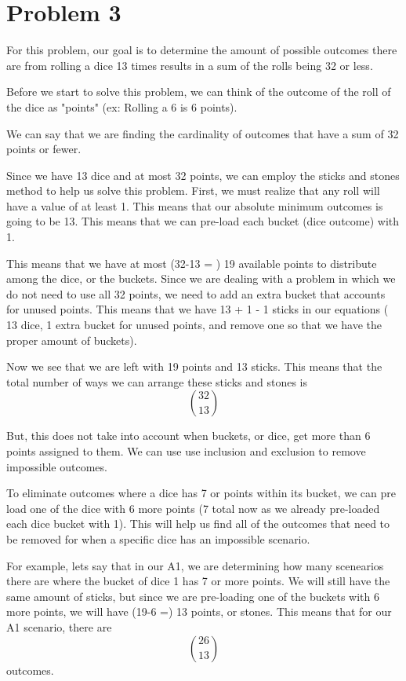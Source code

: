 \documentclass[11pt]{article}
\begin{document}
\section*{Problem 3}

For this problem, our goal is to determine the amount of possible outcomes there are from rolling a dice 13 times results in a sum of the rolls being 32 or less. 

Before we start to solve this problem, we can think of the outcome of the roll of the dice as "points" (ex: Rolling a 6 is 6 points).

We can say that we are finding the cardinality of outcomes that have a sum of 32 points or fewer.

Since we have 13 dice and at most 32 points, we can employ the sticks and stones method to help us solve this problem. First, we must realize that any roll will have a value of at least 1. This means that our absolute minimum outcomes is going to be 13. This means that we can pre-load each bucket (dice outcome) with 1. 

This means that we have at most (32-13 = ) 19 available points to distribute among the dice, or the buckets. Since we are dealing with a problem in which we do not need to use all 32 points, we need to add an extra bucket that accounts for unused points. This means that we have 13 + 1 - 1 sticks in our equations ( 13 dice, 1 extra bucket for unused points, and remove one so that we have the proper amount of buckets).

Now we see that we are left with 19 points and 13 sticks. This means that the total number of ways we can arrange these sticks and stones is  
$$\binom{32}{13}$$

But, this does not take into account when buckets, or dice, get more than 6 points assigned to them. We can use use inclusion and exclusion to remove impossible outcomes. 

To eliminate outcomes where a dice has 7 or points within its bucket, we can pre load one of the dice with 6 more points (7 total now as we already pre-loaded each dice bucket with 1). This will help us find all of the outcomes that need to be removed for when a specific dice has an impossible scenario. 

For example, lets say that in our A1, we are determining how many scenearios there are where the bucket of dice 1 has 7 or more points. We will still have the same amount of sticks, but since we are pre-loading one of the buckets with 6 more points, we will have (19-6 =) 13 points, or stones. This means that for our A1 scenario, there are  
$$\binom{26}{13}$$
outcomes. 
\end{document}
